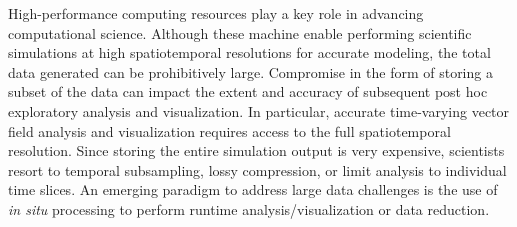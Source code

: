 %
%
%
%
High-performance computing resources play a key role in advancing computational science.
%
Although these machine enable performing scientific simulations at high spatiotemporal resolutions for accurate modeling, the total data generated can be prohibitively large.
%
Compromise in the form of storing a subset of the data can impact the extent and accuracy of subsequent post hoc exploratory analysis and visualization.
%
In particular, accurate time-varying vector field analysis and visualization requires access to the full spatiotemporal resolution.
%
Since storing the entire simulation output is very expensive, scientists resort to temporal subsampling, lossy compression, or limit analysis to individual time slices.
%
An emerging paradigm to address large data challenges is the use of \textit{in situ} processing to perform runtime analysis/visualization or data reduction.
%
%

